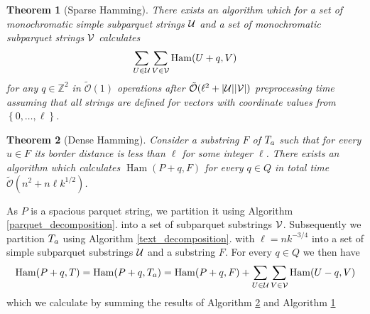 \documentclass[11pt]{article}
\newcommand{\Z}{\mathbb{Z}}
\newcommand{\tO}{\tilde{\mathcal{O}}}
\newcommand{\set}[1]{\left\lbrace #1 \right\rbrace}
\DeclareMathOperator*{\Ham}{Ham}
\theoremstyle{plain}
\newtheorem{theorem}{Theorem}
\theoremstyle{definition}
\begin{document}
\begin{theorem}[Sparse Hamming]
	\label{sparse_algo}
	There exists an algorithm which for a set of monochromatic simple subparquet strings $\mathcal{U}$ and a set of monochromatic subparquet strings $\mathcal{V}$ calculates 
	$$ \sum_{U \in \U}\sum_{V \in \V} \Ham(U + q, V) $$
	for any $q \in \Z^2 $ in $\tO(1)$ operations after $\tO(\ell^2 + |\U||\V|)$ preprocessing time assuming that all strings are defined for vectors with coordinate values from $\set{0, \dots, \ell}$.
\end{theorem}


\begin{theorem}[Dense Hamming]
	\label{dense_algo}
	Consider a substring $F$ of $T_a$ such that for every $u \in F$ its border distance is less than $\ell$ for some integer $\ell$.
	There exists an algorithm which calculates $\Ham(P + q, F)$ for every $q \in Q$ in total time $\tO(n^2 + n \ell k^{1/2})$.
\end{theorem}


As $P$ is a spacious parquet string, we partition it using Algorithm \ref{parquet_decomposition}. into a set of subparquet substrings $\mathcal{V}$.
Subsequently we partition $T_a$ using Algorithm \ref{text_decomposition}. with $\ell = nk^{-3/4}$ into a set of simple subparquet substrings $\mathcal{U}$ and a substring $F$.
For every $q \in Q$ we then have
$$ \Ham(P + q, T) = \Ham(P + q, \Ta) = \Ham(P + q, F) + \sum_{U \in \U}\sum_{V \in \V} \Ham(U - q, V) $$
which we calculate by summing the results of Algorithm \ref{dense_algo} and Algorithm \ref{sparse_algo}
\end{document}
